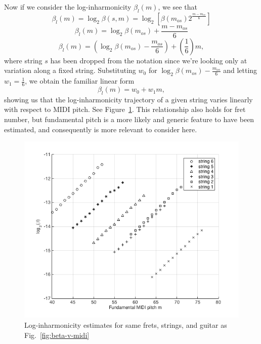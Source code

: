\documentclass[12pt]{cmuthesis}
\begin{document}
Now if we consider the log-inharmonicity $\beta_{l}(m)$, we see that
\begin{equation}
\beta_l(m) = \log_2\beta(s,m) = \log_2[\beta(m_{os})2^{\frac{m-m_{os}}{6}}]
\end{equation}
\begin{equation}
\beta_l(m) = \log_2\beta(m_{os}) + \frac{m-m_{os}}{6}
\end{equation}
\begin{equation}
\beta_l(m) = (\log_2\beta(m_{os})-\frac{m_{os}}{6}) + (\frac{1}{6})m,
\end{equation}
where string $s$ has been dropped from the notation since we're looking only at variation along a fixed string. Substituting $w_0$ for $\log_2\beta(m_{os})-\frac{m_{os}}{6}$ and letting $w_1 = \frac{1}{6}$, we obtain the familiar linear form
\begin{equation}
\label{eq:linear-traj}
\beta_l(m) = w_0 + w_1m,
\end{equation}
showing us that the log-inharmonicity trajectory of a given string varies linearly with respect to MIDI pitch. See Figure~\ref{fig:log-beta-v-midi}. This relationship also holds for fret number, but fundamental pitch is a more likely and generic feature to have been estimated, and consequently is more relevant to consider here.

\begin{figure}[!htbp] 
\centering
\includegraphics[scale=0.7]{log-beta-v-midi}
\caption{Log-inharmonicity estimates for same frets, strings, and guitar as Fig.~\ref{fig:beta-v-midi}}
\label{fig:log-beta-v-midi}
\end{figure}
\end{document}
